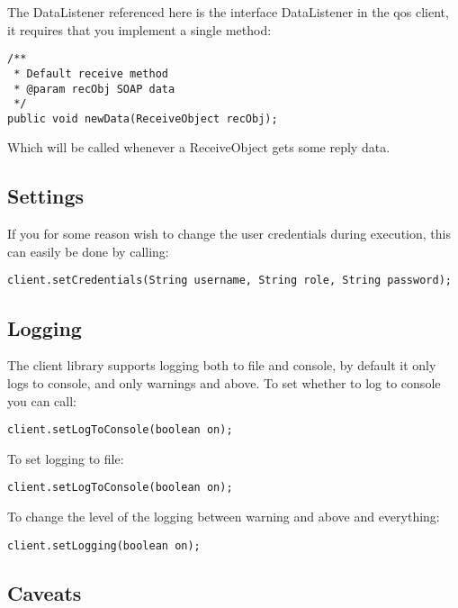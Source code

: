 The DataListener referenced here is the interface DataListener in the qos client, it requires that you implement a single method:

\begin{lstlisting}[caption={The DataListener interface}, label=userguideDatalistener]
/**
 * Default receive method
 * @param recObj SOAP data
 */
public void newData(ReceiveObject recObj);
\end{lstlisting}

Which will be called whenever a ReceiveObject gets some reply data.

\subsection{Settings}\label{userguideSettings}
If you for some reason wish to change the user credentials during execution, this can easily be done by calling:
\begin{lstlisting}[caption={Changing user credentials}, label=userguideCredentials]
    client.setCredentials(String username, String role, String password);
\end{lstlisting}

\subsection{Logging}\label{userguideLogging}
The client library supports logging both to file and console, by default it only logs to console, and only warnings and above.
To set whether to log to console you can call:
\begin{lstlisting}[caption={Turn logging on or of}, label=userguideTogglelogging]
    client.setLogToConsole(boolean on);
\end{lstlisting}
To set logging to file:
\begin{lstlisting}[caption={Turn logging to file on or off}, label=userguideTogglelogtofile]
    client.setLogToConsole(boolean on);
\end{lstlisting}
To change the level of the logging between warning and above and everything:
\begin{lstlisting}[caption={Switch between the two logging scopes}, label=userguideToggleloggingdetails]
    client.setLogging(boolean on);
\end{lstlisting}

\subsection{Caveats}\label{userguideCaveats}
